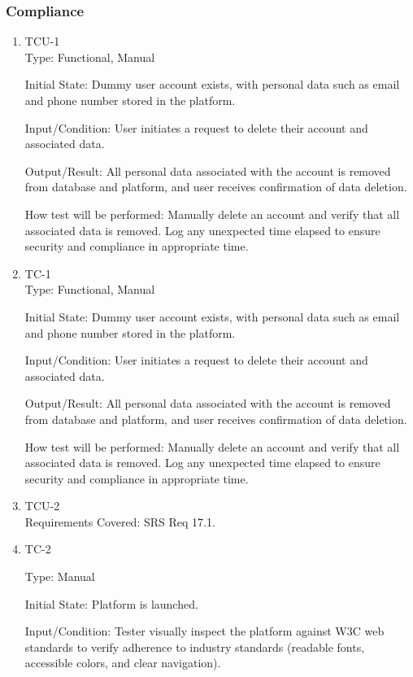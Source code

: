 \documentclass[12pt, titlepage]{article}
\begin{document}
\subsubsection{Compliance}
\begin{enumerate}
  \item{TCU-1\\}
        Type: Functional, Manual

        Initial State: Dummy user account exists, with personal data such as email and phone number stored in the platform.

        Input/Condition: User initiates a request to delete their account and associated data.

        Output/Result: All personal data associated with the account is removed from database and platform, and user receives confirmation of data deletion.

        How test will be performed: Manually delete an account and verify that all associated data is removed. Log any unexpected time elapsed to ensure security and compliance in appropriate time.
\item{TC-1\\}
Type: Functional, Manual
					
Initial State: Dummy user account exists, with personal data such as email and phone number stored in the platform.
					
Input/Condition: User initiates a request to delete their account and associated data.
					
Output/Result: All personal data associated with the account is removed from database and platform, and user receives confirmation of data deletion.
					
How test will be performed: Manually delete an account and verify that all associated data is removed. Log any unexpected time elapsed to ensure security and compliance in appropriate time.

  \item{TCU-2\\}
Requirements Covered: SRS Req 17.1.

\item{TC-2\\}

        Type: Manual

        Initial State: Platform is launched.

        Input/Condition: Tester visually inspect the platform against W3C web standards to verify adherence to industry standards (readable fonts, accessible colors, and clear navigation).


\end{enumerate}
\end{document}
